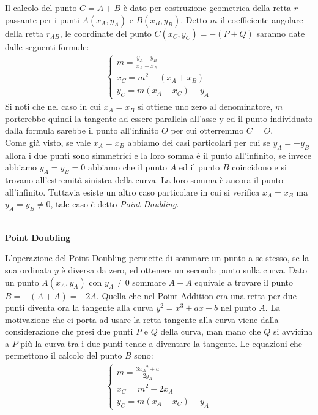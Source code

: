 \documentclass[a4paper,12pt]{tesiinfo}
\newcommand\ddfrac[2]{\frac{\displaystyle #1}{\displaystyle #2}}
\begin{document}
Il calcolo del punto $C = A + B$ \`e dato per costruzione geometrica della retta $r$ passante per i punti $A(x_A, y_A)$ e $B(x_B, y_B)$. Detto $m$ il coefficiente angolare della retta $r_{AB}$, le coordinate del punto $C(x_C, y_C) = -(P+Q)$ saranno date dalle seguenti formule:
\begin{align*}
\begin{cases}
m = \ddfrac{y_A - y_B}{x_A - x_B}\\
x_C = m^2 - (x_A + x_B)\\
y_C = m(x_A - x_C)-y_A
\end{cases}
\end{align*}
Si noti che nel caso in cui $x_A = x_B$ si ottiene uno zero al denominatore, $m$ porterebbe quindi la tangente ad essere parallela all'asse y ed il punto individuato dalla formula sarebbe il punto all'infinito $O$ per cui otterremmo $C = O$.
\\
Come gi\`a visto, se vale $x_A = x_B$ abbiamo dei casi particolari per cui se $y_A = -y_B$ allora i due punti sono simmetrici e la loro somma \`e il punto all'infinito, se invece abbiamo $y_A = y_B = 0$ abbiamo che il punto $A$ ed il punto $B$ coincidono e si trovano all'estremit\`a sinistra della curva. La loro somma \`e ancora il punto all'infinito. Tuttavia esiste un altro caso particolare in cui si verifica $x_A = x_B$ ma $y_A = y_B \ne 0$, tale caso \`e detto \textit{Point Doubling}.
\\
\\
\begin{center}
\textbf{Point Doubling}
\end{center}
L'operazione del Point Doubling permette di sommare un punto a se stesso, se la sua ordinata $y$ \`e diversa da zero, ed ottenere un secondo punto sulla curva. Dato un punto $A(x_A, y_A)$ con $y_A \ne 0$ sommare $A+A$ equivale a trovare il punto $B = -(A+A) = -2A$. Quella che nel Point Addition era una retta per due punti diventa ora la tangente alla curva $y^2 = x^3 + ax +b$ nel punto $A$. La motivazione che ci porta ad usare la retta tangente alla curva viene dalla considerazione che presi due punti $P$ e $Q$ della curva, man mano che $Q$ si avvicina a $P$ pi\`u la curva tra i due punti tende a diventare la tangente. Le equazioni che permettono il calcolo del punto $B$ sono:
\begin{align*}
\begin{cases}
m = \ddfrac{3{x_A}^2 + a}{2y_A}\\
x_C = m^2 - 2x_A\\
y_C = m(x_A - x_C)-y_A
\end{cases}
\end{align*}
\end{document}
